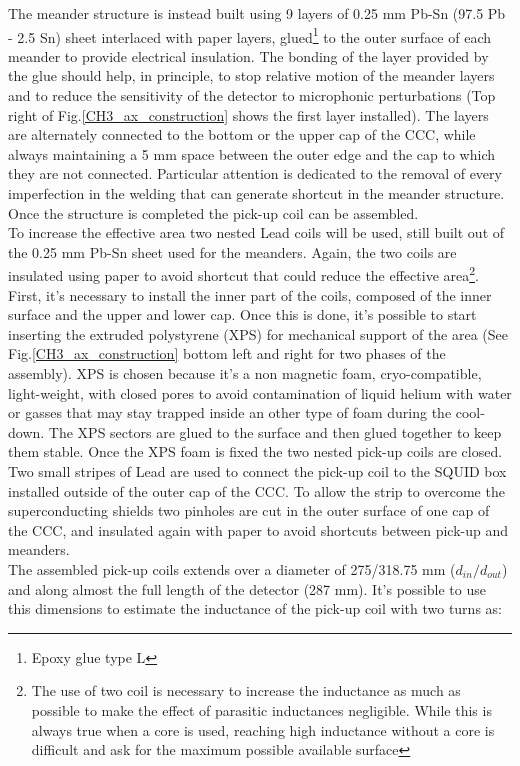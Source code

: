 \documentclass[12pt,a4paper]{report}
\begin{document}
       The meander structure is instead built using 9 layers of 0.25 mm Pb-Sn (97.5 Pb - 2.5 Sn) sheet interlaced with paper layers, glued\footnote{Epoxy glue type L} to the outer surface of each meander to provide electrical insulation. The bonding of the layer provided by the glue should help, in principle, to stop relative motion of the meander layers and to reduce the sensitivity of the detector to microphonic perturbations (Top right of Fig.\ref{CH3_ax_construction} shows the first layer installed). The layers are alternately connected to the bottom or the upper cap of the CCC, while always maintaining a 5 mm space between the outer edge and the cap to which they are not connected. Particular attention is dedicated to the removal of every imperfection in the welding that can generate shortcut in the meander structure. Once the structure is completed the pick-up coil can be assembled. \\
       To increase the effective area two nested Lead coils will be used, still built out of the 0.25 mm Pb-Sn sheet used for the meanders. Again, the two coils are insulated using paper to avoid shortcut that could reduce the effective area\footnote{The use of two coil is necessary to increase the inductance as much as possible to make the effect of parasitic inductances negligible. While this is always true when a core is used, reaching high inductance without a core is difficult and ask for the maximum possible available surface}. First, it's necessary to install the inner part of the coils, composed of the inner surface and the upper and lower cap. Once this is done, it's possible to start inserting the extruded polystyrene (XPS) for mechanical support of the area (See Fig.\ref{CH3_ax_construction} bottom left and right for two phases of the assembly). XPS is chosen because it's a non magnetic foam, cryo-compatible, light-weight, with closed pores to avoid contamination of liquid helium with water or gasses that may stay trapped inside an other type of foam during the cool-down. The XPS sectors are glued to the surface and then glued together to keep them stable. Once the XPS foam is fixed the two nested pick-up coils are closed. Two small stripes of Lead are used to connect the pick-up coil to the SQUID box installed outside of the outer cap of the CCC. To allow the strip to overcome the superconducting shields two pinholes are cut in the outer surface of one cap of the CCC, and insulated again with paper to avoid shortcuts between pick-up and meanders.\\ The assembled pick-up coils extends over a diameter of 275/318.75 mm ($d_{in}/d_{out}$) and along almost the full length of the detector (287 mm). It's possible to use this dimensions to estimate the inductance of the pick-up coil with two turns as:
\end{document}
